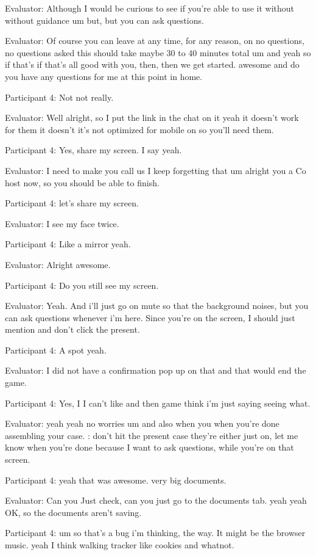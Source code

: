 \documentclass{l4proj}
\begin{document}
\begin{appendices}
Evaluator: Although I would be curious to see if you're able to use it without without guidance um but, but you can ask questions.

Evaluator: Of course you can leave at any time, for any reason, on no questions, no questions asked this should take maybe 30 to 40 minutes total um and yeah so if that's if that's all good with you, then, then we get started. awesome and do you have any questions for me at this point in home.

Participant 4: Not not really.

Evaluator: Well alright, so I put the link in the chat on it yeah it doesn't work for them it doesn't it's not optimized for mobile on so you'll need them.

Participant 4: Yes, share my screen. I say yeah.

Evaluator: I need to make you call us I keep forgetting that um alright you a Co host now, so you should be able to finish.

Participant 4: let's share my screen.

Evaluator: I see my face twice.

Participant 4: Like a mirror yeah.

Evaluator: Alright awesome.

Participant 4: Do you still see my screen.


Evaluator: Yeah. And i'll just go on mute so that the background noises, but you can ask questions whenever i'm here. Since you're on the screen, I should just mention and don't click the present.

Participant 4: A spot yeah.

Evaluator: I did not have a confirmation pop up on that and that would end the game.

Participant 4: Yes, I I can't like and then game think i'm just saying seeing what.

Evaluator: yeah yeah no worries um and also when you when you're done assembling your case. : don't hit the present case they're either just on, let me know when you're done because I want to ask questions, while you're on that screen.

Participant 4: yeah that was awesome. very big documents.

Evaluator: Can you Just check, can you just go to the documents tab. yeah yeah OK, so the documents aren't saving.

Participant 4: um so that's a bug i'm thinking, the way. It might be the browser music. yeah I think walking tracker like cookies and whatnot.


\end{appendices}
\end{document}
